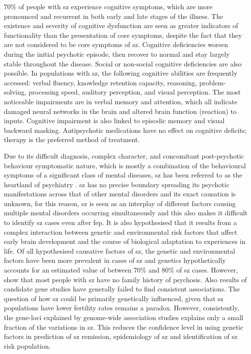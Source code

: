 70\% of people with \ac{sz} experience cognitive symptoms, which are more pronounced and recurrent in both early and late stages 
of the illness. The existence and severity of cognitive dysfunction are seen as greater indicators of functionality than the presentation 
of core symptoms, despite the fact that they are not considered to be core symptoms of \ac{sz}. Cognitive deficiencies worsen 
during the initial psychotic episode, then recover to normal and stay largely stable throughout the disease. Social or non-social 
cognitive deficiencies are also possible. In populations with \ac{sz}, the following cognitive abilities are frequently accessed: verbal fluency, knowledge retention capacity, reasoning, problem-solving, processing speed, auditory perception, and visual perception. The most noticeable impairments are 
in verbal memory and attention, which all indicate damaged neural networks in the brain and altered brain function (reaction) to inputs. Cognitive impairment is also linked to episodic memory and visual backward masking. Antipsychotic medications have no effect on cognitive deficits; therapy is the preferred method of treatment.

Due to its difficult diagnosis, complex character, and concomitant post-psychotic behaviour symptomatic nature, which is mostly a 
combination of the behavioural symptoms of a significant class of mental diseases, \ac{sz} has been referred to as the heartland of 
psychiatry \cite{goodwin2007heartland}. \ac{sz} has no precise boundary spreading its psychotic manifestations across that of other 
mental disorders and its exact causation is unknown, for this reason, \ac{sz} is seen as an interplay of different factors causing 
multiple mental disorders occurring simultaneously and this also makes it difficult to identify \ac{sz} cases even after \ac{fep}. It 
is also hypothesised that it results from a complex interaction between genetic and environmental risk factors that affect early brain 
development and the course of biological adaptation to experiences in life. Of all hypothesised causative factors of \ac{sz}, the genetic and 
environmental factors have been more prevalent in cases of \ac{sz} and genetics hypothetically accounts for an estimated value of 
between 70\% and 80\% of \ac{sz} cases. However, \cite{etiologySZ} show that most people with \ac{sz} have no family history of psychosis. Also results of 
candidate gene studies have generally failed to find consistent associations. The question of how \ac{sz} could be primarily 
genetically influenced, given that \ac{sz} populations have lower fertility rates remains a paradox. However, consistently, the gene-loci 
explained by genome-wide association studies explains only a small fraction of the variations in \ac{sz}. This reduces the confidence level 
in using genetic factors in prediction of \ac{sz} remission, epidemiology of \ac{sz} and identification of \ac{sz} risk population.

